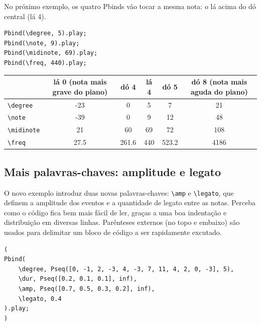 No próximo exemplo, os quatro Pbinds vão tocar a mesma nota: o lá acima do dó central (lá 4).

\begin{lstlisting}[style=SuperCollider-IDE, basicstyle=\scttfamily\footnotesize]
Pbind(\degree, 5).play;
Pbind(\note, 9).play;
Pbind(\midinote, 69).play;
Pbind(\freq, 440).play;
\end{lstlisting}


\bigskip
{}
\bigskip


\begin{tabular}{|l|c|c|c|c|c|}
\hline 
  & \textbf{lá 0 (nota mais grave do piano)} & \textbf{dó 4} & \textbf{lá 4} & \textbf{dó 5} & \textbf{dó 8 (nota mais aguda do piano)} \\ 
\hline 
\texttt{\textbackslash degree} & -23 & 0 & 5 & 7 & 21 \\
\hline
\texttt{\textbackslash note} & -39 & 0 & 9 & 12 & 48 \\
\hline
\texttt{\textbackslash midinote} & 21 & 60 & 69 & 72 & 108 \\
\hline
\texttt{\textbackslash freq} & 27.5 & 261.6 & 440 & 523.2 & 4186 \\
\hline
\end{tabular}
\bigskip


\subsection{Mais palavras-chaves: amplitude e legato}

O novo exemplo introduz duas novas palavras-chaves: \texttt{\textbackslash amp} e \texttt{\textbackslash legato}, que definem a amplitude dos eventos e a quantidade de legato entre as notas. Perceba como o código fica bem mais fácil de ler, graças a uma boa indentação e distribuição em diversas linhas. Parênteses externos (no topo e embaixo) são usados para delimitar um bloco de código a ser rapidamente excutado.

 
\begin{lstlisting}[style=SuperCollider-IDE, basicstyle=\scttfamily\footnotesize]
(
Pbind(
	\degree, Pseq([0, -1, 2, -3, 4, -3, 7, 11, 4, 2, 0, -3], 5),
	\dur, Pseq([0.2, 0.1, 0.1], inf),
	\amp, Pseq([0.7, 0.5, 0.3, 0.2], inf),
	\legato, 0.4
).play;
)
\end{lstlisting}
 

